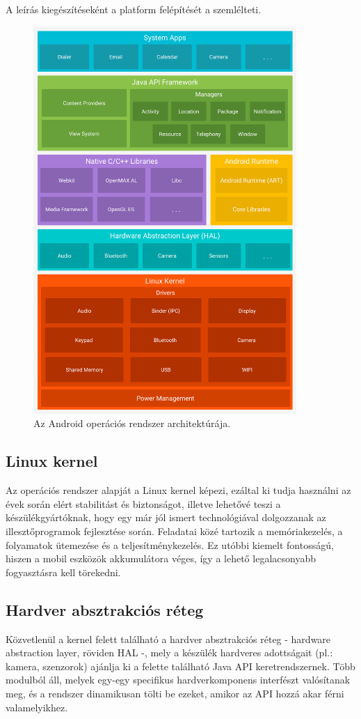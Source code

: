 A leírás kiegészítéseként a platform felépítését a  szemlélteti.
\begin{figure}[!ht]
	\centering
	\includegraphics[width=100mm, keepaspectratio]{figures/android-stack_2x.png}
	\caption{Az Android operációs rendszer architektúrája.}
	\label{fig:AndroidPlatform}
\end{figure}

\subsection{Linux kernel}
Az operációs rendszer alapját a Linux kernel képezi, ezáltal ki tudja használni az évek során elért stabilitást és biztonságot, illetve lehetővé teszi a készülékgyártóknak, hogy egy már jól ismert technológiával dolgozzanak az illesztőprogramok fejlesztése során. Feladatai közé tartozik a memóriakezelés, a folyamatok ütemezése és a teljesítménykezelés. Ez utóbbi kiemelt fontosságú, hiszen a mobil eszközök akkumulátora véges, így a lehető legalacsonyabb fogyasztásra kell törekedni. \cite{MobWeb}

\subsection{Hardver absztrakciós réteg}
Közvetlenül a kernel felett található a hardver absztrakciós réteg - hardware abstraction layer, röviden HAL -, mely a készülék hardveres adottságait (pl.: kamera, szenzorok) ajánlja ki a felette található Java API keretrendszernek. Több modulból áll, melyek egy-egy specifikus hardverkomponens interfészt valósítanak meg, és a rendszer dinamikusan tölti be ezeket, amikor az API hozzá akar férni valamelyikhez. \cite{PlatformGuide}

